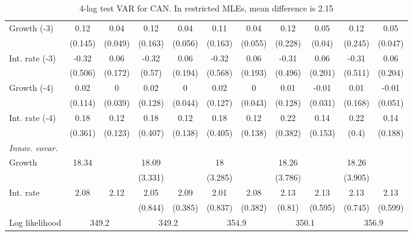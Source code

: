 \begin{table}[htbp]
\begin{tabular}{@{\extracolsep{4pt}}lcccccccccc@{}}
\quad Growth (-3) 	 &0.12 	 & 0.04 	 & 0.12 	 & 0.04 	 & 0.11 	 & 0.04 	 & 0.12 	 & 0.05 	 & 0.12 	 & 0.05	 \\ 
 		 & (0.145) 	 & (0.049) 	 & (0.163) 	 & (0.056) 	 & (0.163) 	 & (0.055) 	 & (0.228) 	 & (0.04) 	 & (0.245) 	 & (0.047) 	 \\ 
\quad Int. rate (-3) 	 &-0.32 	 & 0.06 	 & -0.32 	 & 0.06 	 & -0.32 	 & 0.06 	 & -0.31 	 & 0.06 	 & -0.31 	 & 0.06	 \\ 
 		 & (0.506) 	 & (0.172) 	 & (0.57) 	 & (0.194) 	 & (0.568) 	 & (0.193) 	 & (0.496) 	 & (0.201) 	 & (0.511) 	 & (0.204) 	 \\ 
\quad Growth (-4) 	 &0.02 	 & 0 	 & 0.02 	 & 0 	 & 0.02 	 & 0 	 & 0.01 	 & -0.01 	 & 0.01 	 & -0.01	 \\ 
 		 & (0.114) 	 & (0.039) 	 & (0.128) 	 & (0.044) 	 & (0.127) 	 & (0.043) 	 & (0.128) 	 & (0.031) 	 & (0.168) 	 & (0.051) 	 \\ 
\quad Int. rate (-4) 	 &0.18 	 & 0.12 	 & 0.18 	 & 0.12 	 & 0.18 	 & 0.12 	 & 0.22 	 & 0.14 	 & 0.22 	 & 0.14	 \\ 
 		 & (0.361) 	 & (0.123) 	 & (0.407) 	 & (0.138) 	 & (0.405) 	 & (0.138) 	 & (0.382) 	 & (0.153) 	 & (0.4) 	 & (0.188) 	 \\ 
\rule{0pt}{4ex} \emph{Innov. covar.}  	 & 	 & 	 & 	 & 	 & 	 & 	 & 	 & 	 & 	 &\\ 
\quad Growth 	 &18.34 	 &  	 & 18.09 	 &  	 & 18 	 &  	 & 18.26 	 &  	 & 18.26 	 & 	 \\ 
 		 &  	 &  	 & (3.331) 	 &  	 & (3.285) 	 &  	 & (3.786) 	 &  	 & (3.905) 	 &  	 \\ 
\quad Int. rate 	 &2.08 	 & 2.12 	 & 2.05 	 & 2.09 	 & 2.01 	 & 2.08 	 & 2.13 	 & 2.13 	 & 2.13 	 & 2.13	 \\ 
 		 &  	 &  	 & (0.844) 	 & (0.385) 	 & (0.837) 	 & (0.382) 	 & (0.81) 	 & (0.595) 	 & (0.745) 	 & (0.599) 	 \\ 
 \hline \rule{0pt}{4ex} 
  Log likelihood 	 &\multicolumn{2}{c}{349.2} 	 & \multicolumn{2}{c}{349.2} 	 & \multicolumn{2}{c}{354.9} 	 & \multicolumn{2}{c}{350.1} 	 & \multicolumn{2}{c}{356.9}\\ 

 \hline 	\end{tabular}		\caption{4-lag test VAR for CAN. In restricted MLEs, mean difference is 2.15}
		\label{tab:CAN4}

\end{table}